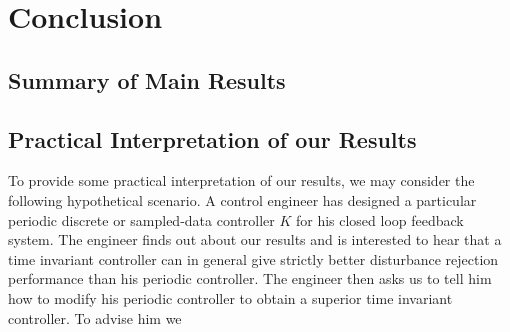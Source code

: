 \chapter{Conclusion }  \label{Conc}


\section{Summary of Main  Results} \label{MainRes}


\section{Practical Interpretation of our   Results} \label{PracInt}

To  provide some practical interpretation of our  results, we  may  consider the
following hypothetical  scenario. A   control  engineer   has
 designed  a  particular    periodic discrete or sampled-data  controller $K$  for
his closed loop  feedback system.  The engineer finds  out  about  our results and is
interested to hear  that  a  time  invariant controller   can  in  general
give strictly better disturbance rejection  performance than  his  periodic
controller. The engineer then asks  us  to tell  him how to modify  his  periodic
controller to obtain  a  superior   time  invariant controller. To  advise  him   we

